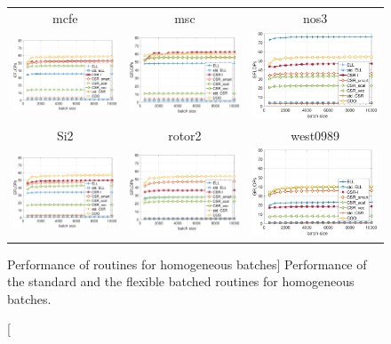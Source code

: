 \begin{figure}[t]
\begin{center}
\begin{tabular}{ccc}
\\
\hline
{\sc mcfe} & {\sc msc} & {\sc nos3}\\
\includegraphics[width=.30\columnwidth]{plots/single_matrices/GFLOPS/mcfe_GFLOPs}
&
\includegraphics[width=.30\columnwidth]{plots/single_matrices/GFLOPS/msc00726_GFLOPs}
&
\includegraphics[width=.30\columnwidth]{plots/single_matrices/GFLOPS/nos3_GFLOPs}
\\
\hline
{\sc Si2} & {\sc rotor2} & {\sc west0989}\\
\includegraphics[width=.30\columnwidth]{plots/single_matrices/GFLOPS/Si2_GFLOPs}
&
\includegraphics[width=.30\columnwidth]{plots/single_matrices/GFLOPS/rotor2_GFLOPs}
&
\includegraphics[width=.30\columnwidth]{plots/single_matrices/GFLOPS/west0989_GFLOPs}

\end{tabular}
\end{center}
\caption
[Performance of \spmv routines for homogeneous batches]
{Performance of the standard and the flexible batched \spmv routines 
for homogeneous batches.}
\label{2017-batched-spmv:fig:selectperf}
\end{figure}

